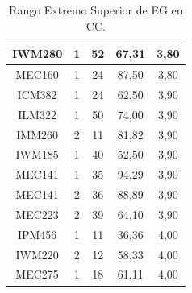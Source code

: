 \documentclass[12pt]{article}
\begin{document}
\begin{table}[H]
{{\begin{minipage}[b]{.5\hsize}
{\begin{tabular}{|c|c|c|c|c|}
            \rowcolor[HTML]{DAEBFB} 
            IWM280 & 1 & 52 & 67,31 & 3,80 \\ \hline
            \rowcolor[HTML]{DAEBFB} 
            MEC160 & 1 & 24 & 87,50 & 3,80 \\ \hline
            \rowcolor[HTML]{DAEBFB} 
            ICM382 & 1 & 24 & 62,50 & 3,90 \\ \hline
            \rowcolor[HTML]{DAEBFB} 
            ILM322 & 1 & 50 & 74,00 & 3,90 \\ \hline
            \rowcolor[HTML]{DAEBFB} 
            IMM260 & 2 & 11 & 81,82 & 3,90 \\ \hline
            \rowcolor[HTML]{DAEBFB} 
            IWM185 & 1 & 40 & 52,50 & 3,90 \\ \hline
            \rowcolor[HTML]{DAEBFB} 
            MEC141 & 1 & 35 & 94,29 & 3,90 \\ \hline
            \rowcolor[HTML]{DAEBFB} 
            MEC141 & 2 & 36 & 88,89 & 3,90 \\ \hline
            \rowcolor[HTML]{DAEBFB} 
            MEC223 & 2 & 39 & 64,10 & 3,90 \\ \hline
            \rowcolor[HTML]{DAEBFB} 
            IPM456 & 1 & 11 & 36,36 & 4,00 \\ \hline
            \rowcolor[HTML]{DAEBFB} 
            IWM220 & 2 & 12 & 58,33 & 4,00 \\ \hline
            \rowcolor[HTML]{DAEBFB} 
            MEC275 & 1 & 18 & 61,11 & 4,00 \\ \hline
        \end{tabular}}
        \caption{Rango Extremo Superior de EG en CC.}
    \end{minipage}\hfil
}}
\end{table}
\end{document}

